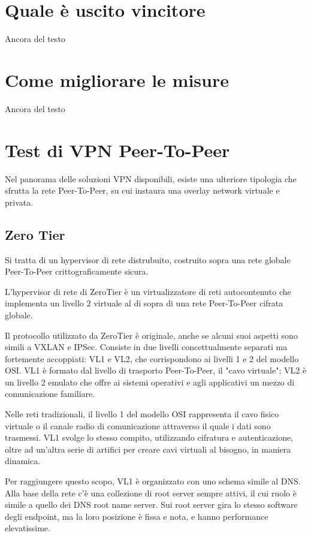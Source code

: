 \section{Quale è uscito vincitore}
Ancora del testo

\section{Come migliorare le misure}
Ancora del testo

\section{Test di VPN Peer-To-Peer}
Nel panorama delle soluzioni VPN disponibili, esiste una ulteriore tipologia che sfrutta la rete Peer-To-Peer, su cui instaura una overlay network virtuale e privata.

\subsection{Zero Tier}
Si tratta di un hypervisor di rete distrubuito, costruito sopra una rete globale Peer-To-Peer crittograficamente sicura.

L'hypervisor di rete di ZeroTier è un virtualizzatore di reti autocontenuto che implementa un livello 2 virtuale al di sopra di una rete Peer-To-Peer cifrata globale.

Il protocollo utilizzato da ZeroTier è originale, anche se alcuni suoi aspetti sono simili a VXLAN e IPSec. Consiste in due livelli concettualmente separati ma fortemente accoppiati: VL1 e VL2, che corrispondono ai livelli 1 e 2 del modello OSI. VL1 è formato dal livello di trasporto Peer-To-Peer, il "cavo virtuale"; VL2 è un livello 2 emulato che offre ai sistemi operativi e agli applicativi un mezzo di comunicazione familiare.

Nelle reti tradizionali, il livello 1 del modello OSI rappresenta il cavo fisico virtuale o il canale radio di comunicazione attraverso il quale i dati sono trasmessi. VL1 svolge lo stesso compito, utilizzando cifratura e autenticazione, oltre ad un'altra serie di artifici per creare cavi virtuali al bisogno, in maniera dinamica.

Per raggiungere questo scopo, VL1 è organizzato con uno schema simile al DNS. Alla base della rete c'è una collezione di root server sempre attivi, il cui ruolo è simile a quello dei DNS root name server. Sui root server gira lo stesso software degli endpoint, ma la loro posizione è fissa e nota, e hanno performance elevatissime.

